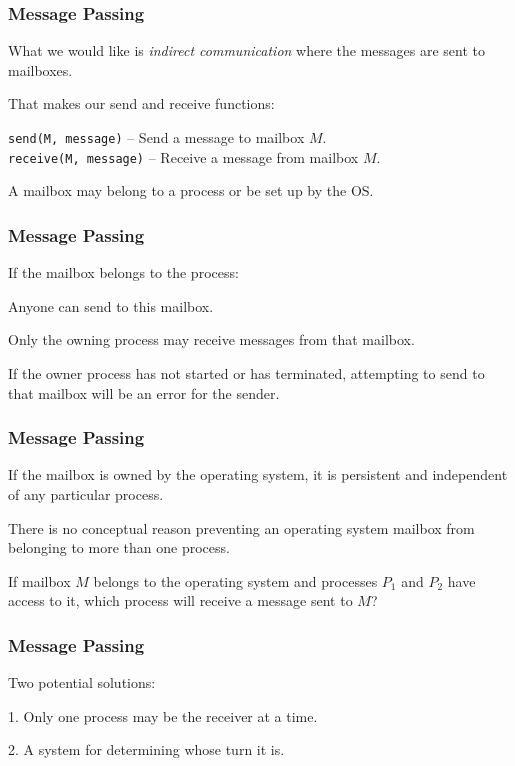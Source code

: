 \begin{frame}
\frametitle{Message Passing}

What we would like is \textit{indirect communication} where the messages are sent to mailboxes. 

That makes our send and receive functions:

\texttt{send(M, message)} -- Send a message to mailbox $M$.\\
\texttt{receive(M, message)} -- Receive a message from mailbox $M$.

A mailbox may belong to a process or be set up by the OS.

\end{frame}

\begin{frame}
\frametitle{Message Passing}
If the mailbox belongs to the process: 

Anyone can send to this mailbox. 

Only the owning process may receive messages from that mailbox. 

If the owner process has not started or has terminated, attempting to send to that mailbox will be an error for the sender.

\end{frame}

\begin{frame}
\frametitle{Message Passing}

If the mailbox is owned by the operating system, it is persistent and independent of any particular process. 

There is no conceptual reason preventing an operating system mailbox from belonging to more than one process. 

If mailbox $M$ belongs to the operating system and processes $P_{1}$ and $P_{2}$ have access to it, which process will receive a message sent to $M$?

\end{frame}

\begin{frame}
\frametitle{Message Passing}

Two potential solutions:

1. Only one process may be the receiver at a time.

2. A system for determining whose turn it is.

\end{frame}

